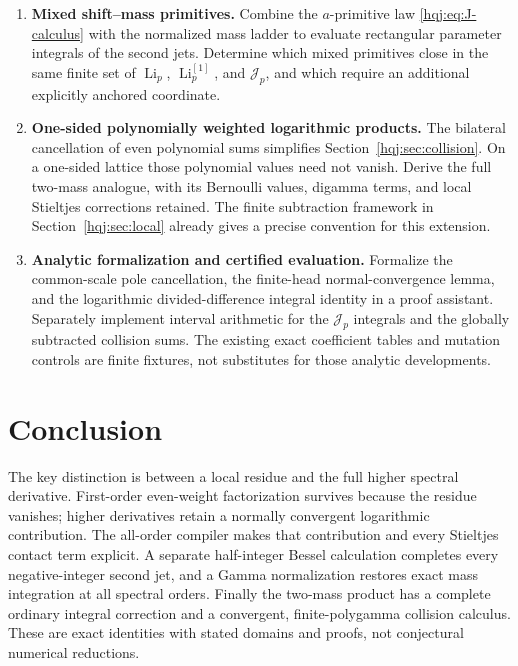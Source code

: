 \documentclass[11pt,letterpaper]{article}
\numberwithin{equation}{section}
\theoremstyle{definition}
\newcommand{\Li}{\operatorname{Li}}
\begin{document}
\begin{enumerate}
\item \textbf{Mixed shift--mass primitives.}
Combine the $a$-primitive law \eqref{hqj:eq:J-calculus} with the
normalized mass ladder to evaluate rectangular parameter integrals
of the second jets. Determine which mixed primitives close in the
same finite set of $\Li_p$, $\Li_p^{[1]}$, and $\mathcal J_p$, and
which require an additional explicitly anchored coordinate.

\item \textbf{One-sided polynomially weighted logarithmic products.}
The bilateral cancellation of even polynomial sums simplifies
Section~\ref{hqj:sec:collision}. On a one-sided lattice those
polynomial values need not vanish. Derive the full two-mass
analogue, with its Bernoulli values, digamma terms, and local
Stieltjes corrections retained. The finite subtraction framework
in Section~\ref{hqj:sec:local} already gives a precise convention
for this extension.

\item \textbf{Analytic formalization and certified evaluation.}
Formalize the common-scale pole cancellation, the finite-head
normal-convergence lemma, and the logarithmic divided-difference
integral identity in a proof assistant. Separately implement interval
arithmetic for the $\mathcal J_p$ integrals and the globally
subtracted collision sums. The existing exact coefficient tables
and mutation controls are finite fixtures, not substitutes for those
analytic developments.
\end{enumerate}

\section*{Conclusion}
The key distinction is between a local residue and the full higher
spectral derivative. First-order even-weight factorization survives
because the residue vanishes; higher derivatives retain a normally
convergent logarithmic contribution. The all-order compiler makes that
contribution and every Stieltjes contact term explicit. A separate
half-integer Bessel calculation completes every negative-integer second
jet, and a Gamma normalization restores exact mass integration at all
spectral orders. Finally the two-mass product has a complete ordinary
integral correction and a convergent, finite-polygamma collision
calculus. These are exact identities with stated domains and proofs,
not conjectural numerical reductions.
\end{document}

